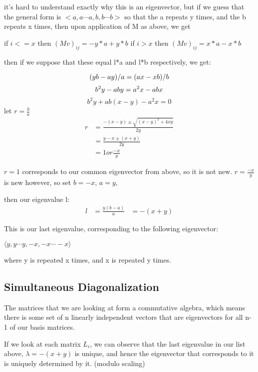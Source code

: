 \documentclass{report}
\begin{document}
it's hard to understand exactly why this is an eigenvector, but if we guess
that the general form is $<a, a\cdots a, b, b\cdots b>$ so that the a repeats y
times, and the b repeats x times, then upon application of M as above, we get

if $i <= x$
then ${(Mv)}_{ij} = -y*a + y*b$
if $i > x$
then ${(Mv)}_{ij} = x*a - x*b$

then if we suppose that these equal l*a and l*b respectively, we get:

\begin{equation*}
	(yb - ay)/a = (ax - xb)/b\\
\end{equation*}
\begin{equation*}
	b^2y - aby = a^2x - abx\\
\end{equation*}
\begin{equation*}
	b^2y + ab(x - y) - a^2x = 0
\end{equation*}
let $r = \frac{b}{a}$
\begin{align*}
	r &= \frac{-(x-y) \pm \sqrt{{(x-y)}^2 + 4xy}}{2y}\\
	  &= \frac{y - x \pm (x + y)}{2y}\\
	  &= 1 or \frac{-x}{y}
\end{align*}

$r = 1$ corresponds to our common eigenvector from above, so it is not new.
$r = \frac{-x}{y}$ is new however, so set $b = -x$, $a = y$,

then our eigenvalue l:
\begin{align*}
	l &= \frac{y(b - a)}{a}
	  &= -(x + y)
\end{align*}

This is our last eigenvalue, corresponding to the following eigenvector:

$\langle y, y\cdots y, -x, -x\cdots -x\rangle$

where y is repeated x times, and x is repeated y times.


\subsection{Simultaneous Diagonalization}

The matrices that we are looking at form a commutative algebra, which means
there is some set of n linearly independent vectors that are eigenvectors for
all n-1 of our basis matrices.

If we look at each matrix $L_i$, we can observe that the last eigenvalue in our
list above, $\lambda = -(x + y)$ is unique, and hence the eigenvector that corresponds
to it is uniquely determined by it. (modulo scaling)
\end{document}
